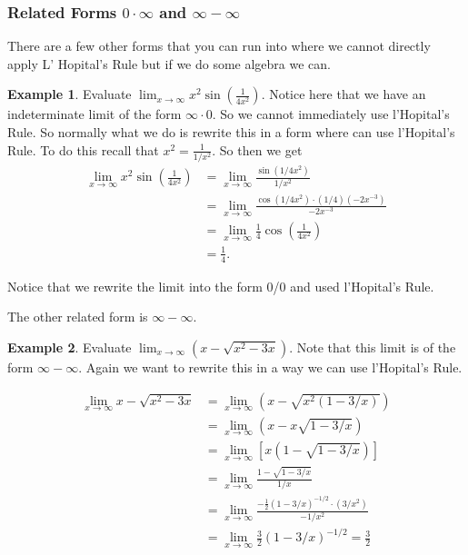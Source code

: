\documentclass[12pt,reqno]{article}
\theoremstyle{definition}
\newtheorem*{Example}{Example}
\begin{document}
\subsubsection{Related Forms $0 \cdot \infty$ and $\infty - \infty$}

There are a few other forms that you can run into where we cannot directly apply L' Hopital's Rule but if we do some algebra we can. 
\begin{Example}
 Evaluate $\lim_{x \to \infty} x^2 \sin\left(\frac{1}{4x^2}\right)$. Notice here that we have an indeterminate limit of the form $\infty \cdot 0$. So we cannot immediately use l'Hopital's Rule. So normally what we do is rewrite this in a form where can use l'Hopital's Rule. To do this recall that $x^2 = \frac{1}{1/x^2}$. So then we get 
\begin{align*}
	\lim_{x \to \infty} x^2 \sin(\frac{1}{4x^2}) &= \lim_{x \to \infty} \frac{\sin (1/4x^2)}{1/x^2} \\
	&= \lim_{x \to \infty} \frac{\cos(1/4x^2) \cdot (1/4)(-2x^{-3})}{-2 x^{-3}} \\ 
	&= \lim_{x \to \infty} \frac{1}{4} \cos\left(\frac{1}{4x^2}\right) \\
	&= \frac{1}{4}.
\end{align*}

Notice that we rewrite the limit into the form 0/0 and used l'Hopital's Rule. 
\end{Example}

The other related form is $\infty - \infty$. 
\begin{Example}
	Evaluate $\lim_{x \to \infty} (x - \sqrt{x^2 - 3x})$. Note that this limit is of the form $\infty - \infty$. Again we want to rewrite this in a way we can use l'Hopital's Rule. 
	
	\begin{align*}
		\lim_{x \to \infty} x - \sqrt{x^2 - 3x} &= \lim_{x \to \infty}(x - \sqrt{x^2(1 - 3/x)}) \\
		&= \lim_{x \to \infty}(x - x\sqrt{1 - 3/x}) \\
		&= \lim_{x \to \infty}[x (1 - \sqrt{1 - 3/x})] \\
		&= \lim_{x \to \infty} \frac{1 - \sqrt{1 - 3/x}}{1/x} \\
		&= \lim_{x \to \infty} \frac{-\frac{1}{2} (1 - 3/x)^{-1/2}\cdot (3/x^2)}{-1/x^2} \\
		&= \lim_{x \to \infty} \frac{3}{2} (1 - 3/x)^{-1/2} = \frac{3}{2}
	\end{align*}
\end{Example}
\end{document}
